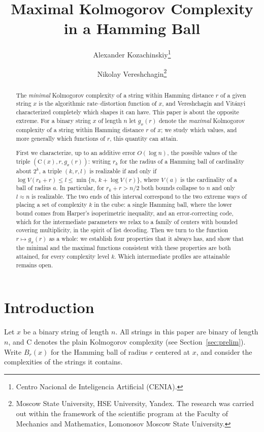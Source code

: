 \documentclass[11pt,a4paper]{article}
\title{Maximal Kolmogorov Complexity in a Hamming Ball}
\author{Alexander Kozachinskiy\thanks{Centro Nacional de Inteligencia
Artificial (CENIA).}
\and Nikolay Vereshchagin\thanks{Moscow State University, HSE University,
Yandex. The research was carried out within the framework of the scientific
program at the Faculty of Mechanics and Mathematics, Lomonosov Moscow State
University.}}
\date{}
\theoremstyle{definition}
\newcommand{\C}{\mathrm{C}}
\renewcommand{\le}{\leqslant}
\begin{document}
\maketitle

\begin{abstract}
The \emph{minimal} Kolmogorov complexity of a string within Hamming distance $r$
of a given string $x$ is the algorithmic rate--distortion function of $x$, and
Vereshchagin and Vit\'anyi characterized completely which shapes it can have.
This paper is about the opposite extreme. For a binary string $x$ of length $n$
let $g_x(r)$ denote the \emph{maximal} Kolmogorov complexity of a string within
Hamming distance $r$ of $x$; we study which values, and more generally which
functions of $r$, this quantity can attain.

First we characterize, up to an additive error $O(\log n)$, the possible values
of the triple $(\C(x),r,g_x(r))$: writing $r_k$ for the radius of a Hamming ball
of cardinality about $2^{k}$, a triple $(k,r,l)$ is realizable if and only if
$\log V(r_k+r)\le l\le\min\{n,\,k+\log V(r)\}$, where $V(a)$ is the
cardinality of a ball of radius $a$. In particular, for $r_k+r>n/2$ both bounds
collapse to $n$ and only $l\approx n$ is realizable. The two ends of this
interval correspond to the two extreme ways of placing a set of complexity $k$
in the cube: a single Hamming ball, where the lower bound comes from Harper's
isoperimetric inequality, and an error-correcting code, which for the
intermediate parameters we relax to a family of centers with bounded covering
multiplicity, in the spirit of list decoding. Then we turn to the function
$r\mapsto g_x(r)$ as a whole: we establish four properties that it always has,
and show that the minimal and the maximal functions consistent with these
properties are both attained, for every complexity level $k$. Which intermediate
profiles are attainable remains open.
\end{abstract}

\section{Introduction}

Let $x$ be a binary string of length $n$. All strings in this paper are binary
of length $n$, and $\C$ denotes the plain Kolmogorov complexity (see
Section~\ref{sec:prelim}). Write $B_r(x)$ for the Hamming ball of radius $r$
centered at $x$, and consider the complexities of the strings it contains.
\end{document}
